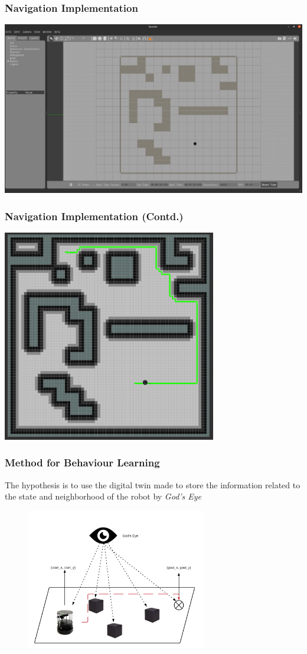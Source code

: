 \documentclass{beamer}
\begin{document}
\begin{frame}
    \frametitle{Navigation Implementation}
    \includegraphics[width=\textwidth]{images/base_god_eye_world.png}
\end{frame}

\begin{frame}
    \frametitle{Navigation Implementation (Contd.)}
    \includegraphics[width=0.7\textwidth]{images/RVIZ-Grid.png}
\end{frame}

\begin{frame}
    \frametitle{Method for Behaviour Learning}
    The hypothesis is to use the digital twin made to store the information related to
    the state and neighborhood of the robot by \textit{God's Eye} 

    \begin{figure}
        \includegraphics[width=0.7\textwidth]{images/God-eye.png}
    \end{figure}
\end{frame}
\end{document}
